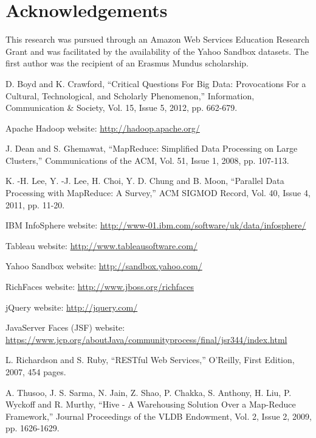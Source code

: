 \documentclass[10pt, conference, compsocconf]{IEEEtran}
\begin{document}
\section{Acknowledgements}

This research was pursued through an Amazon Web Services Education Research Grant and was facilitated by the availability of the Yahoo Sandbox datasets. The first author was the recipient of an Erasmus Mundus scholarship. 

\begin{thebibliography}{00}

D. Boyd and K. Crawford, ``Critical Questions For Big Data: Provocations For a Cultural, Technological, and Scholarly Phenomenon,'' Information, Communication \& Society, Vol. 15, Issue 5, 2012, pp. 662-679.

Apache Hadoop website: \url{http://hadoop.apache.org/}

J. Dean and S. Ghemawat, ``MapReduce: Simplified Data Processing on Large Clusters,'' Communications of the ACM, Vol. 51, Issue 1, 2008, pp. 107-113.

K. -H. Lee, Y. -J. Lee, H. Choi, Y. D. Chung and B. Moon, ``Parallel Data Processing with MapReduce: A Survey,'' ACM SIGMOD Record, Vol. 40, Issue 4, 2011, pp. 11-20. 

IBM InfoSphere website: \url{http://www-01.ibm.com/software/uk/data/infosphere/}

Tableau website: \url{http://www.tableausoftware.com/}

Yahoo Sandbox website: \url{http://sandbox.yahoo.com/}

RichFaces website: \url{http://www.jboss.org/richfaces}

jQuery website: \url{http://jquery.com/}

JavaServer Faces (JSF) website: \url{https://www.jcp.org/aboutJava/communityprocess/final/jsr344/index.html}

L. Richardson and S. Ruby, ``RESTful Web Services,'' O'Reilly, First Edition, 2007, 454 pages.

A. Thusoo, J. S. Sarma, N. Jain, Z. Shao, P. Chakka, S. Anthony, H. Liu, P. Wyckoff and R. Murthy, ``Hive - A Warehousing Solution Over a Map-Reduce Framework,'' Journal Proceedings of the VLDB Endowment, Vol. 2, Issue 2, 2009, pp. 1626-1629. 


\end{thebibliography}
\end{document}
